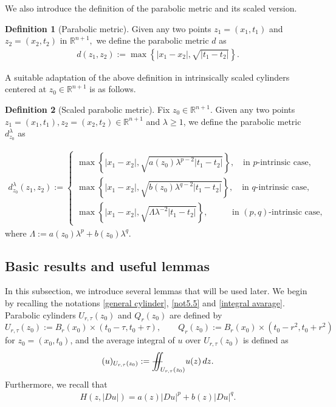 \documentclass[11pt,oneside, english,reqno,twoside a4paper]{amsart}
\theoremstyle{definition}
\newtheorem{definition}{Definition}[section]
\numberwithin{theorem}{section}
\numberwithin{equation}{section}
\newcommand{\la}{\lambda}
\newcommand{\La}{\Lambda}
\newcommand{\RR}{\mathbb{R}}
\newcommand{\iintss}{{\int\hspace{-0.28cm}\int}}
\newcommand{ \miints }{{\iintss\hspace{-0.56cm} -\hspace{-0.15cm}-}}
\newcommand{\miint}[1]{{\miints_{\hspace{-0.13cm}#1}}}
\begin{document}
\vspace{0.5cm}

We also introduce the definition of the parabolic metric and its scaled version.

\begin{definition}[Parabolic metric]\label{parabolic metric}
Given any two points $z_1=(x_1, t_1)$ and $z_2=(x_2, t_2)$ in $\RR^{n+1},$ we define the parabolic metric $d$ as 
\begin{align*}
d(z_1, z_2):=\max\left\{|x_1-x_2|, \sqrt{|t_1-t_2|}\right\}.
\end{align*}
\end{definition}
\vspace{.3cm}
A suitable adaptation of the above definition in intrinsically scaled cylinders centered at $z_0\in \RR^{n+1}$ is as follows.
\begin{definition}[Scaled parabolic metric]\label{para metric}
Fix $z_0 \in \RR^{n+1}.$ Given any two points $z_1=(x_1, t_1), z_2=(x_2, t_2) \in \RR^{n+1}$ and $\lambda\geq 1$, we define the parabolic metric $d^{\la}_{z_0}$ as


\begin{align*}
\displaystyle
d^{\la}_{z_0}(z_1,z_2):=\left\{\begin{array}{l}
\max\left\{|x_1-x_2|, \sqrt{a(z_0)\lambda^{p-2}|t_1-t_2|}\right\},\quad \text{in $p$-intrinsic case,}\\
\max\left\{|x_1-x_2|, \sqrt{b(z_0)\lambda^{q-2}|t_1-t_2|}\right\},\quad \text{in $q$-intrinsic case,}\\
\max\left\{|x_1-x_2|, \sqrt{\Lambda \lambda^{-2}|t_1-t_2|}\right\},\quad\quad\,\,\,\,\, \text{in $(p,q)$-intrinsic case,}
\end{array}\right.
\end{align*}
where $\La:=a(z_0)\la^p+b(z_0)\la^q.$   
\end{definition}



\subsection{Basic results and useful lemmas}
In this subsection, we introduce several lemmas that will be used later.
We begin by recalling the notations \ref{general cylinder}, \ref{not5.5} and \ref{integral avarage}. Parabolic cylinders
$U_{r,\tau}(z_0)$ and $Q_r(z_0)$ are defined by
    $$ U_{r,\tau}(z_0) := B_r(x_0)\times (t_0-\tau,t_0+\tau), \qquad Q_r(z_0) := B_r(x_0)\times (t_0-r^2,t_0+r^2)$$
for $z_0=(x_0,t_0)$, and the average integral of $u$ over $U_{r, \tau}(z_0)$ is defined as
\[(u)_{U_{r, \tau}(z_0)}:=\miint{U_{r, \tau}(z_0)}u(z)\,dz.\] Furthermore, we recall that
\begin{align*}
    H(z,|Du|)=a(z)|Du|^p+b(z)|Du|^q.
\end{align*}
\end{document}
